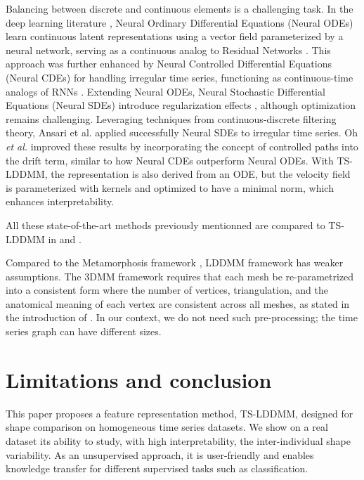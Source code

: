  Balancing between discrete and continuous elements is a challenging task.
 In the deep learning literature \cite{chen2018neural, kidger2020neural, tzen2019neural, jia2019neural, liu2019neural, ansari2023neural}, Neural Ordinary Differential Equations (Neural ODEs) \cite{chen2018neural} learn continuous latent representations using a vector field parameterized by a neural network, serving as a continuous analog to Residual Networks \cite{zagoruyko2016wide}.
 This approach was further enhanced by Neural Controlled Differential Equations (Neural CDEs) \cite{kidger2020neural} for handling irregular time series, functioning as continuous-time analogs of RNNs \cite{schuster1997bidirectional}.
 Extending Neural ODEs, Neural Stochastic Differential Equations (Neural SDEs) introduce regularization effects \cite{liu2019neural}, although optimization remains challenging.
 Leveraging techniques from continuous-discrete filtering theory, Ansari et al. \cite{ansari2023neural} applied successfully Neural SDEs to irregular time series.
 Oh \textit{et al.} \cite{oh2024stable} improved these results by incorporating the concept of controlled paths into the drift term, similar to how Neural CDEs outperform Neural ODEs.
 With TS-LDDMM, the representation is also derived from an ODE, but the velocity field is parameterized with kernels and optimized to have a minimal norm, which enhances interpretability.

 All these state-of-the-art methods previously mentionned \cite{glaunes2008large,oh2024stable,wu2024shape,heo2024logistic} are compared to TS-LDDMM in  and .

 Compared to the Metamorphosis framework \cite{blanz2003face}, LDDMM framework has weaker assumptions.
 The 3DMM framework requires that each mesh be re-parametrized into a consistent form where the number of vertices, triangulation, and the anatomical meaning of each vertex are consistent across all meshes, as stated in the introduction of \cite{booth20163d}.
In our context, we do not need such pre-processing; the time series graph can have different sizes.
 \vspace{-1ex}
\section{Limitations and conclusion}
\vspace{-1ex}
\label{sec:limitations}
  
This paper proposes a feature representation method, TS-LDDMM, designed for 
shape comparison on homogeneous time series datasets. We show on a real dataset 
its ability to study, with high interpretability, the inter-individual shape 
variability. As an unsupervised approach, it is user-friendly and enables knowledge 
transfer for different supervised tasks such as classification.

